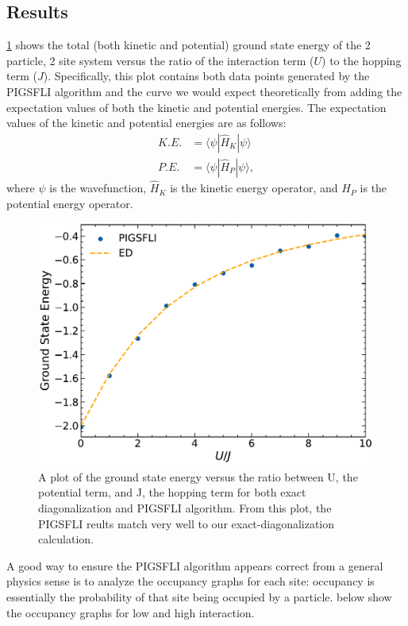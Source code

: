 \subsection{Results}

\cref*{fig:total_energy} shows the total (both kinetic and potential) ground state energy of the 2 particle, 2 site system versus the ratio of the interaction term ($U$) to the hopping term ($J$). Specifically, this plot contains both data points generated by the PIGSFLI algorithm and the curve we would expect theoretically from adding the expectation values of both the kinetic and potential energies. The expectation values of the kinetic and potential energies are as follows: 
\begin{align*}
    K.E. &= \langle \psi | \hat{H}_K | \psi \rangle \\
    P.E. &= \langle \psi | \hat{H}_P | \psi \rangle,
\end{align*}
where $\psi$ is the wavefunction, $\hat{H}_K$ is the kinetic energy operator, and $\hat{H}_P$ is the potential energy operator.
\begin{figure}[H]
\centering
\includegraphics[scale=0.5]{../figures/total_energy.pdf}
\caption{A plot of the ground state energy versus the ratio between U, the potential term, and J, the hopping term for both exact diagonalization and PIGSFLI algorithm. From this plot, the PIGSFLI reults match very well to our exact-diagonalization calculation.}
\label{fig:total_energy}
\end{figure}
\newpage

A good way to ensure the PIGSFLI algorithm appears correct from a general physics sense is to analyze the occupancy graphs for each site: occupancy is essentially the probability of that site being occupied by a particle.  below show the occupancy graphs for low and high interaction.

